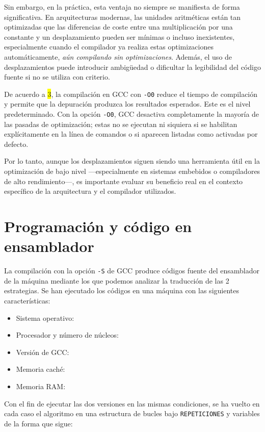 \documentclass[11pt,a4paper,twoside]{article}
\theoremstyle{definition}
\begin{document}
	Sin embargo, en la práctica, esta ventaja no siempre se manifiesta de forma significativa. En arquitecturas modernas, las unidades aritméticas están tan optimizadas que las diferencias de coste entre una multiplicación por una constante y un desplazamiento pueden ser mínimas o incluso inexistentes, especialmente cuando el compilador ya realiza estas optimizaciones automáticamente, \textit{aún compilando sin optimizaciones}. Además, el uso de desplazamientos puede introducir ambigüedad o dificultar la legibilidad del código fuente si no se utiliza con criterio.
	
	De acuerdo a \colorbox{yellow}{3}, la compilación en GCC con \texttt{-O0} reduce el tiempo de compilación y permite que la depuración produzca los resultados esperados. Este es el nivel predeterminado. Con la opción \texttt{-O0}, GCC desactiva completamente la mayoría de las pasadas de optimización; estas no se ejecutan ni siquiera si se habilitan explícitamente en la línea de comandos o si aparecen listadas como activadas por defecto.
	
	Por lo tanto, aunque los desplazamientos siguen siendo una herramienta útil en la optimización de bajo nivel ---especialmente en sistemas embebidos o compiladores de alto rendimiento---, es importante evaluar su beneficio real en el contexto específico de la arquitectura y el compilador utilizados.
	
	
	\section{Programación y código en ensamblador}
	
	La compilación con la opción \texttt{-S} de GCC produce códigos fuente del ensamblador de la máquina mediante los que podemos analizar la traducción de las 2 estrategias. Se han ejecutado los códigos en una máquina con las siguientes características:
	
	\begin{itemize}
		\item Sistema operativo:
		\item Procesador y número de núcleos:
		\item Versión de GCC:
		\item Memoria caché:
		\item Memoria RAM: 
	\end{itemize}

	Con el fin de ejecutar las dos versiones en las mismas condiciones, se ha vuelto en cada caso el algoritmo en una estructura de bucles bajo \texttt{REPETICIONES} y variables de la forma que sigue:
	
\end{document}
